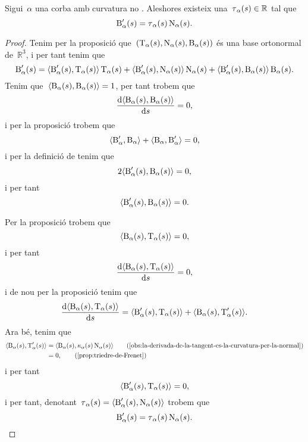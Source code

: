 \documentclass[../../main.tex]{subfiles}
\begin{document}
    \begin{proposition}
        \label{prop:torsio}
        Sigui~\(\alpha\) una corba amb curvatura no \nulla{}.
        Aleshores existeix una~\(\operatorname{\tau}_{\alpha}(s)\in\mathbb{R}\) tal que
        \[
            \operatorname{B}'_{\alpha}(s)=\operatorname{\tau}_{\alpha}(s)\operatorname{N}_{\alpha}(s).
        \]
    \end{proposition}
    \begin{proof}
        Tenim per la proposició  que~\((\operatorname{T}_{\alpha}(s),\operatorname{N}_{\alpha}(s),\operatorname{B}_{\alpha}(s))\) és una base ortonormal de~\(\mathbb{R}^{3}\), i per tant tenim que %
        \[
            \binormal'_{\alpha}(s)=\prodesc{\binormal'_{\alpha}(s)}{\tangent_{\alpha}(s)}\tangent_{\alpha}(s)+\prodesc{\binormal'_{\alpha}(s)}{\normal_{\alpha}(s)}\normal_{\alpha}(s)+\prodesc{\binormal'_{\alpha}(s)}{\binormal_{\alpha}(s)}\binormal_{\alpha}(s).
        \]
        Tenim que~\(\prodesc{\binormal_{\alpha}(s)}{\binormal_{\alpha}(s)}=1\), per tant trobem que
        \[
            \frac{\diff\prodesc{\binormal_{\alpha}(s)}{\binormal_{\alpha}(s)}}{\diff s}=0,
        \]
        i per la proposició  trobem que
        \[
            \prodesc{\binormal'_{\alpha}}{\binormal_{\alpha}}+\prodesc{\binormal_{\alpha}}{\binormal'_{\alpha}}=0,
        \]
        i per la definició de  tenim que
        \[
            2\prodesc{\binormal'_{\alpha}(s)}{\binormal_{\alpha}(s)}=0,
        \]
        i per tant
        \[
            \prodesc{\binormal'_{\alpha}(s)}{\binormal_{\alpha}(s)}=0.
        \]

        Per la proposició  trobem que
        \[
            \prodesc{\binormal_{\alpha}(s)}{\tangent_{\alpha}(s)}=0,
        \]
        i per tant
        \[
            \frac{\diff\prodesc{\binormal_{\alpha}(s)}{\tangent_{\alpha}(s)}}{\diff s}=0,
        \]
        i de nou per la proposició  tenim que
        \[
            \frac{\diff\prodesc{\binormal_{\alpha}(s)}{\tangent_{\alpha}(s)}}{\diff s}=\prodesc{\binormal'_{\alpha}(s)}{\tangent_{\alpha}(s)}+\prodesc{\binormal_{\alpha}(s)}{\tangent'_{\alpha}(s)}.
        \]
        Ara bé, tenim que
        \begin{align*}
            \prodesc{\binormal_{\alpha}(s)}{\tangent'_{\alpha}(s)}&=\prodesc{\binormal_{\alpha}(s)}{\curvatura_{\alpha}(s)\normal_{\alpha}(s)} \tag{\ref{obs:la-derivada-de-la-tangent-es-la-curvatura-per-la-normal}} \\
            &=0, \tag{\ref{prop:triedre-de-Frenet}}
        \end{align*}
        i per tant
        \[
            \prodesc{\binormal'_{\alpha}(s)}{\tangent_{\alpha}(s)}=0,
        \]
        i per tant, denotant~\(\torsio_{\alpha}(s)=\prodesc{\binormal'_{\alpha}(s)}{\normal_{\alpha}(s)}\) trobem que
        \[
            \operatorname{B}'_{\alpha}(s)=\operatorname{\tau}_{\alpha}(s)\operatorname{N}_{\alpha}(s).\qedhere
        \]
    \end{proof}
\end{document}

